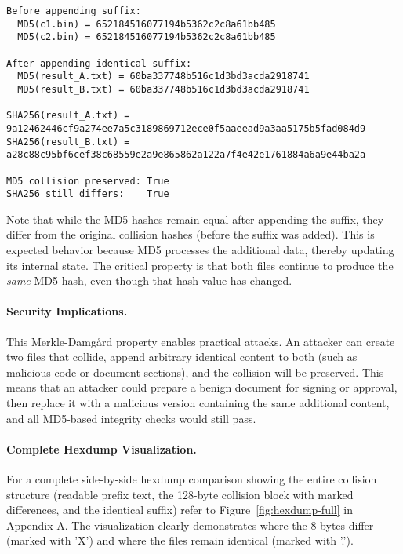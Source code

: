 \documentclass[runningheads]{llncs}
\begin{document}
    \begin{lstlisting}[style=hashblock,caption={Merkle-Damgård property verification},label={lst:ipc-merkle}]
Before appending suffix:
  MD5(c1.bin) = 652184516077194b5362c2c8a61bb485
  MD5(c2.bin) = 652184516077194b5362c2c8a61bb485

After appending identical suffix:
  MD5(result_A.txt) = 60ba337748b516c1d3bd3acda2918741
  MD5(result_B.txt) = 60ba337748b516c1d3bd3acda2918741

SHA256(result_A.txt) = 9a12462446cf9a274ee7a5c3189869712ece0f5aaeead9a3aa5175b5fad084d9
SHA256(result_B.txt) = a28c88c95bf6cef38c68559e2a9e865862a122a7f4e42e1761884a6a9e44ba2a

MD5 collision preserved: True
SHA256 still differs:    True
    \end{lstlisting}

    Note that while the MD5 hashes remain equal after appending the suffix, they differ from the original collision hashes (before the suffix was added). This is expected behavior because MD5 processes the additional data, thereby updating its internal state. The critical property is that both files continue to produce the \emph{same} MD5 hash, even though that hash value has changed.

    \paragraph{Security Implications.}
    This Merkle-Damgård property enables practical attacks. An attacker can create two files that collide, append arbitrary identical content to both (such as malicious code or document sections), and the collision will be preserved. This means that an attacker could prepare a benign document for signing or approval, then replace it with a malicious version containing the same additional content, and all MD5-based integrity checks would still pass.

    \paragraph{Complete Hexdump Visualization.}
    For a complete side-by-side hexdump comparison showing the entire collision structure (readable prefix text, the 128-byte collision block with marked differences, and the identical suffix) refer to Figure~\ref{fig:hexdump-full} in Appendix A. The visualization clearly demonstrates where the 8 bytes differ (marked with 'X') and where the files remain identical (marked with '.').
\end{document}

